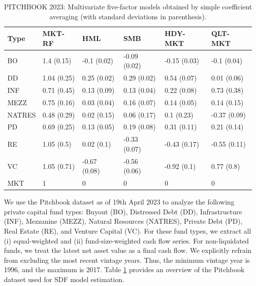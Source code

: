 \documentclass[12pt]{article}
\begin{document}
\begin{table}[ht]
	\centering
	\begin{tabular}{llllll}
		Type & MKT-RF & HML & SMB & HDY-MKT & QLT-MKT \\ 
		\hline
		\hline
		BO & 1.4 (0.15) & -0.1 (0.02) & -0.09 (0.02) & -0.15 (0.03) & -0.1 (0.04) \\ 
		DD & 1.04 (0.25) & 0.25 (0.02) & 0.29 (0.02) & 0.54 (0.07) & 0.01 (0.06) \\ 
		INF & 0.71 (0.45) & 0.13 (0.09) & 0.13 (0.04) & 0.22 (0.08) & 0.73 (0.38) \\ 
		MEZZ & 0.75 (0.16) & 0.03 (0.04) & 0.16 (0.07) & 0.14 (0.05) & 0.14 (0.15) \\ 
		NATRES & 0.48 (0.29) & 0.02 (0.15) & 0.06 (0.17) & 0.1 (0.23) & -0.37 (0.09) \\ 
		PD & 0.69 (0.25) & 0.13 (0.05) & 0.19 (0.08) & 0.31 (0.11) & 0.21 (0.14) \\ 
		RE & 1.05 (0.5) & 0.02 (0.1) & -0.33 (0.07) & -0.43 (0.17) & -0.55 (0.11) \\ 
		VC & 1.05 (0.71) & -0.67 (0.08) & -0.56 (0.06) & -0.92 (0.1) & 0.77 (0.8) \\ 
		\hline
		MKT & 1 & 0 & 0 & 0 & 0 \\ 
		\hline
		\hline
	\end{tabular}
	\caption{
		PITCHBOOK 2023: Multivariate five-factor models obtained by simple coefficient averaging (with standard deviations in parenthesis).
	} 
	\label{tab:average_coefs_2023}
\end{table}

We use the Pitchbook dataset as of 19th April 2023 to analyze the following private capital fund types: 
Buyout (BO), 
Distressed Debt (DD), 
Infrastructure (INF), 
Mezzanine (MEZZ),
Natural Resources (NATRES), 
Private Debt (PD), 
Real Estate (RE), 
and Venture Capital (VC).
For these fund types, we extract all (i) equal-weighted and (ii) fund-size-weighted cash flow series.
For non-liquidated funds, we treat the latest net asset value as a final cash flow.
We explicitly refrain from excluding the most recent vintage years.
Thus, the minimum vintage year is 1996, and the maximum is 2017.
Table \ref{tab:average_coefs_2023} provides an overview of the Pitchbook dataset used for SDF model estimation.
\end{document}
